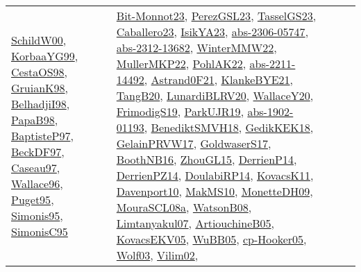 {\begin{longtable}{lp{3cm}>{\raggedright}p{6cm}>{\raggedright}p{6cm}p{8cm}}
\href{articles/SchildW00.pdf}{SchildW00}\cite{SchildW00}, \href{papers/KorbaaYG99.pdf}{KorbaaYG99}\cite{KorbaaYG99}, \href{papers/CestaOS98.pdf}{CestaOS98}\cite{CestaOS98}, \href{papers/GruianK98.pdf}{GruianK98}\cite{GruianK98}, \href{articles/BelhadjiI98.pdf}{BelhadjiI98}\cite{BelhadjiI98}, \href{articles/PapaB98.pdf}{PapaB98}\cite{PapaB98}, \href{papers/BaptisteP97.pdf}{BaptisteP97}\cite{BaptisteP97}, \href{papers/BeckDF97.pdf}{BeckDF97}\cite{BeckDF97}, \href{papers/Caseau97.pdf}{Caseau97}\cite{Caseau97}, \href{articles/Wallace96.pdf}{Wallace96}\cite{Wallace96}, \href{papers/Puget95.pdf}{Puget95}\cite{Puget95}, \href{papers/Simonis95.pdf}{Simonis95}\cite{Simonis95}, \href{papers/SimonisC95.pdf}{SimonisC95}\cite{SimonisC95} & \href{papers/Bit-Monnot23.pdf}{Bit-Monnot23}\cite{Bit-Monnot23}, \href{papers/PerezGSL23.pdf}{PerezGSL23}\cite{PerezGSL23}, \href{papers/TasselGS23.pdf}{TasselGS23}\cite{TasselGS23}, \href{articles/Caballero23.pdf}{Caballero23}\cite{Caballero23}, \href{articles/IsikYA23.pdf}{IsikYA23}\cite{IsikYA23}, \href{articles/abs-2306-05747.pdf}{abs-2306-05747}\cite{abs-2306-05747}, \href{articles/abs-2312-13682.pdf}{abs-2312-13682}\cite{abs-2312-13682}, \href{papers/WinterMMW22.pdf}{WinterMMW22}\cite{WinterMMW22}, \href{articles/MullerMKP22.pdf}{MullerMKP22}\cite{MullerMKP22}, \href{articles/PohlAK22.pdf}{PohlAK22}\cite{PohlAK22}, \href{articles/abs-2211-14492.pdf}{abs-2211-14492}\cite{abs-2211-14492}, \href{papers/Astrand0F21.pdf}{Astrand0F21}\cite{Astrand0F21}, \href{papers/KlankeBYE21.pdf}{KlankeBYE21}\cite{KlankeBYE21}, \href{papers/TangB20.pdf}{TangB20}\cite{TangB20}, \href{articles/LunardiBLRV20.pdf}{LunardiBLRV20}\cite{LunardiBLRV20}, \href{articles/WallaceY20.pdf}{WallaceY20}\cite{WallaceY20}, \href{papers/FrimodigS19.pdf}{FrimodigS19}\cite{FrimodigS19}, \href{papers/ParkUJR19.pdf}{ParkUJR19}\cite{ParkUJR19}, \href{articles/abs-1902-01193.pdf}{abs-1902-01193}\cite{abs-1902-01193}, \href{papers/BenediktSMVH18.pdf}{BenediktSMVH18}\cite{BenediktSMVH18}, \href{articles/GedikKEK18.pdf}{GedikKEK18}\cite{GedikKEK18}, \href{papers/GelainPRVW17.pdf}{GelainPRVW17}\cite{GelainPRVW17}, \href{papers/GoldwaserS17.pdf}{GoldwaserS17}\cite{GoldwaserS17}, \href{papers/BoothNB16.pdf}{BoothNB16}\cite{BoothNB16}, \href{papers/ZhouGL15.pdf}{ZhouGL15}\cite{ZhouGL15}, \href{papers/DerrienP14.pdf}{DerrienP14}\cite{DerrienP14}, \href{papers/DerrienPZ14.pdf}{DerrienPZ14}\cite{DerrienPZ14}, \href{papers/DoulabiRP14.pdf}{DoulabiRP14}\cite{DoulabiRP14}, \href{articles/KovacsK11.pdf}{KovacsK11}\cite{KovacsK11}, \href{papers/Davenport10.pdf}{Davenport10}\cite{Davenport10}, \href{papers/MakMS10.pdf}{MakMS10}\cite{MakMS10}, \href{papers/MonetteDH09.pdf}{MonetteDH09}\cite{MonetteDH09}, \href{papers/MouraSCL08a.pdf}{MouraSCL08a}\cite{MouraSCL08a}, \href{papers/WatsonB08.pdf}{WatsonB08}\cite{WatsonB08}, \href{papers/Limtanyakul07.pdf}{Limtanyakul07}\cite{Limtanyakul07}, \href{papers/ArtiouchineB05.pdf}{ArtiouchineB05}\cite{ArtiouchineB05}, \href{papers/KovacsEKV05.pdf}{KovacsEKV05}\cite{KovacsEKV05}, \href{papers/WuBB05.pdf}{WuBB05}\cite{WuBB05}, \href{papers/cp-Hooker05.pdf}{cp-Hooker05}\cite{cp-Hooker05}, \href{papers/Wolf03.pdf}{Wolf03}\cite{Wolf03}, \href{papers/Vilim02.pdf}{Vilim02}\cite{Vilim02}, 
\end{longtable}}
